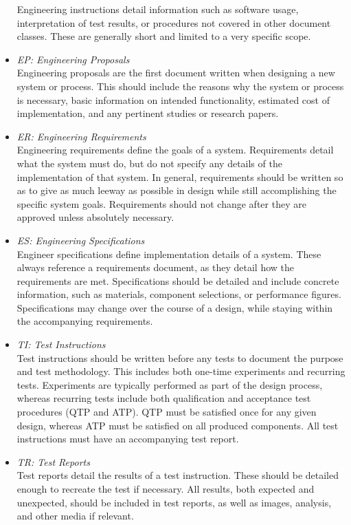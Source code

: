 \documentclass[12pt,article]{memoir}
\begin{document}
\begin{itemize}
Engineering instructions detail information such as software usage, interpretation of test results, or procedures not covered in other document classes. These are generally short and limited to a very specific scope.
\item \textit{EP: Engineering Proposals}\\
Engineering proposals are the first document written when designing a new system or process. This should include the reasons why the system or process is necessary, basic information on intended functionality, estimated cost of implementation, and any pertinent studies or research papers.
\item \textit{ER: Engineering Requirements}\\
Engineering requirements define the goals of a system. Requirements detail what the system must do, but do not specify any details of the implementation of that system. In general, requirements should be written so as to give as much leeway as possible in design while still accomplishing the specific system goals. Requirements should not change after they are approved unless absolutely necessary.
\item \textit{ES: Engineering Specifications}\\
Engineer specifications define implementation details of a system. These always reference a requirements document, as they detail how the requirements are met. Specifications should be detailed and include concrete information, such as materials, component selections, or performance figures. Specifications may change over the course of a design, while staying within the accompanying requirements.
\item \textit{TI: Test Instructions}\\
Test instructions should be written before any tests to document the purpose and test methodology. This includes both one-time experiments and recurring tests. Experiments are typically performed as part of the design process, whereas recurring tests include both qualification and acceptance test procedures (QTP and ATP). QTP must be satisfied once for any given design, whereas ATP must be satisfied on all produced components. All test instructions must have an accompanying test report.
\item \textit{TR: Test Reports}\\
Test reports detail the results of a test instruction. These should be detailed enough to recreate the test if necessary. All results, both expected and unexpected, should be included in test reports, as well as images, analysis, and other media if relevant.
\end{itemize}
\end{document}
